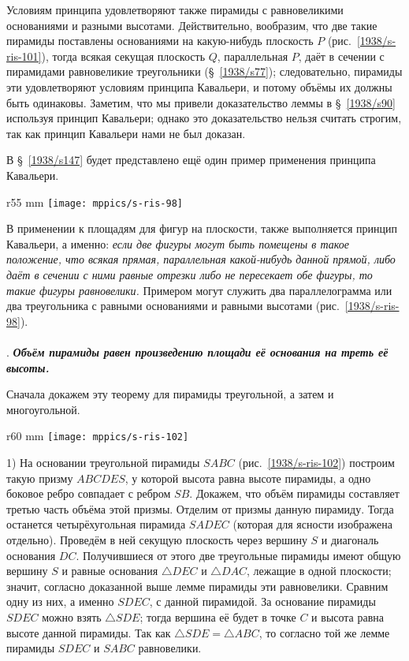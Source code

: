 Условиям принципа удовлетворяют также пирамиды с равновеликими основаниями и разными высотами.
Действительно, вообразим, что две такие пирамиды поставлены основаниями на какую-нибудь плоскость $P$ (рис.~\ref{1938/s-ris-101}), тогда всякая секущая плоскость $Q$, параллельная $P$, даёт в сечении с пирамидами равновеликие треугольники (§~\ref{1938/s77});
следовательно, пирамиды эти удовлетворяют условиям принципа Кавальери, и потому объёмы их должны быть одинаковы.
Заметим, что мы привели доказательство леммы в §~\ref{1938/s90} используя принцип Кавальери;
однако это доказательство нельзя считать строгим, так как принцип Кавальери нами не был доказан.

В §~\ref{1938/s147} будет представлено ещё один пример применения принципа Кавальери.

\begin{wrapfigure}{r}{55 mm}
\vskip-0mm
\centering
\texttt{[image: mppics/s-ris-98]}
\caption{}\label{1938/s-ris-98}
\vskip-0mm
\end{wrapfigure}

В применении к площадям для фигур на плоскости, также выполняется принцип Кавальери, а именно: 
\emph{если две фигуры могут быть помещены в такое положение, что всякая прямая, параллельная какой-нибудь данной прямой, либо даёт в сечении с ними равные отрезки либо не пересекает обе фигуры, то такие фигуры равновелики.}
Примером могут служить два параллелограмма или два треугольника с равными основаниями и равными высотами (рис.~\ref{1938/s-ris-98}).

\paragraph{}\label{1938/s91}
.
\textbf{\emph{Объём пирамиды равен произведению площади её основания на треть её высоты.}}

Сначала докажем эту теорему для пирамиды треугольной, а затем и многоугольной.


\begin{wrapfigure}{r}{60 mm}
\vskip-0mm
\centering
\texttt{[image: mppics/s-ris-102]}
\caption{}\label{1938/s-ris-102}
\vskip-0mm
\end{wrapfigure}

1) На основании треугольной пирамиды $SABC$ (рис.~\ref{1938/s-ris-102}) построим такую призму $ABCDES$, у которой высота равна высоте пирамиды, а одно боковое ребро совпадает с ребром $SB$.
Докажем, что объём пирамиды составляет третью часть объёма этой призмы.
Отделим от призмы данную пирамиду.
Тогда останется четырёхугольная пирамида $SADEC$ (которая для ясности изображена отдельно).
Проведём в ней секущую плоскость через вершину $S$ и диагональ основания $DC$.
Получившиеся от этого две треугольные пирамиды имеют общую вершину $S$ и равные основания $\triangle DEC$ и $\triangle DAC$, лежащие в одной плоскости;
значит, согласно доказанной выше лемме пирамиды эти равновелики.
Сравним одну из них, а именно $SDEC$, с данной пирамидой.
За основание пирамиды $SDEC$ можно взять $\triangle SDE$;
тогда вершина её будет в точке $C$ и высота равна высоте данной пирамиды.
Так как $\triangle SDE=\triangle ABC$, то согласно той же лемме пирамиды $SDEC$ и $SABC$ равновелики.

